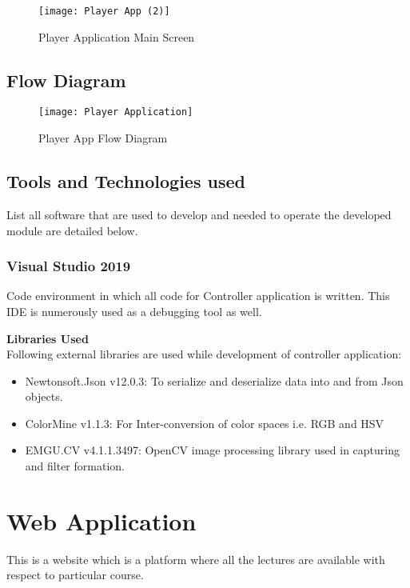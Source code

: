 \begin{figure}[h]
  \centering
  \texttt{[image: Player App (2)]}
  \caption{Player Application Main Screen}
\end{figure}

\newpage
\subsection{Flow Diagram}
\begin{figure}[h]
  \centering
  \texttt{[image: Player Application]}
  \caption{Player App Flow Diagram}
\end{figure}

\subsection{Tools and Technologies used}
List all software that are used to develop and needed to operate the developed module are detailed below.

\subsubsection{Visual Studio 2019}
Code environment in which all code for Controller application is written. This IDE is numerously used as a debugging tool as well.

\textbf{Libraries Used}\\
Following external libraries are used while development of controller application:

\begin{itemize}

\item Newtonsoft.Json v12.0.3: To serialize and deserialize data into and from Json objects.
\item ColorMine v1.1.3: For Inter-conversion of color spaces i.e. RGB and HSV
\item EMGU.CV v4.1.1.3497: OpenCV image processing library used in capturing and filter formation.

\end{itemize}

\section{Web Application}
This is a website which is a platform where all the lectures are available with respect to particular course.
\newpage

